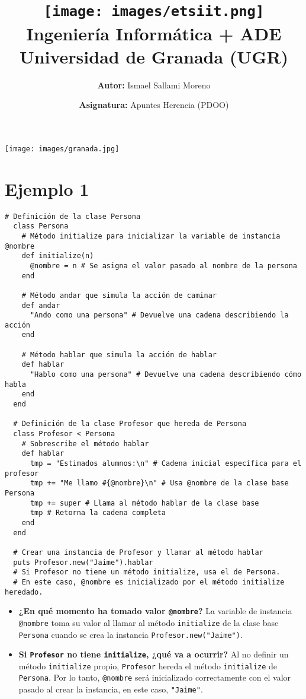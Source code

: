 \documentclass[a4paper,12pt]{article}
\title{
    \vspace{-2cm}
    \texttt{[image: images/etsiit.png]} \\ %
    \LARGE Ingeniería Informática + ADE\\
    \large Universidad de Granada (UGR)\\[1cm]
}
\author{\textbf{Autor:} Ismael Sallami Moreno}
\date{\textbf{Asignatura:} Apuntes Herencia (PDOO)\\[1cm]}
\begin{document}
\maketitle
\thispagestyle{empty}

\begin{center}
    \texttt{[image: images/granada.jpg]} \\ %
    \vfill
\end{center}

\newpage

\tableofcontents
\newpage

\section{Ejemplo 1}

\begin{lstlisting}[style=customruby]
  # Definición de la clase Persona
  class Persona
    # Método initialize para inicializar la variable de instancia @nombre
    def initialize(n)
      @nombre = n # Se asigna el valor pasado al nombre de la persona
    end
  
    # Método andar que simula la acción de caminar
    def andar
      "Ando como una persona" # Devuelve una cadena describiendo la acción
    end
  
    # Método hablar que simula la acción de hablar
    def hablar
      "Hablo como una persona" # Devuelve una cadena describiendo cómo habla
    end
  end
  
  # Definición de la clase Profesor que hereda de Persona
  class Profesor < Persona
    # Sobrescribe el método hablar
    def hablar
      tmp = "Estimados alumnos:\n" # Cadena inicial específica para el profesor
      tmp += "Me llamo #{@nombre}\n" # Usa @nombre de la clase base Persona
      tmp += super # Llama al método hablar de la clase base
      tmp # Retorna la cadena completa
    end
  end
  
  # Crear una instancia de Profesor y llamar al método hablar
  puts Profesor.new("Jaime").hablar
  # Si Profesor no tiene un método initialize, usa el de Persona.
  # En este caso, @nombre es inicializado por el método initialize heredado.
  \end{lstlisting}
  
  \begin{itemize}
    \item \textbf{¿En qué momento ha tomado valor \texttt{@nombre}?}  
          La variable de instancia \texttt{@nombre} toma su valor al llamar al método \texttt{initialize} de la clase base \texttt{Persona} cuando se crea la instancia \texttt{Profesor.new("Jaime")}.
    \item \textbf{Si \texttt{Profesor} no tiene \texttt{initialize}, ¿qué va a ocurrir?}  
          Al no definir un método \texttt{initialize} propio, \texttt{Profesor} hereda el método \texttt{initialize} de \texttt{Persona}. Por lo tanto, \texttt{@nombre} será inicializado correctamente con el valor pasado al crear la instancia, en este caso, \texttt{"Jaime"}.
  \end{itemize}
\end{document}
